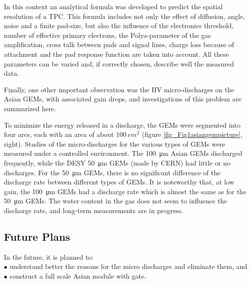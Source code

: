 In this context an analytical formula was developed to predict the spatial resolution of a TPC. This formula includes
not only the effect of diffusion, angle,
noise and a finite pad-size, but also the influence of the electronics threshold, number of effective primary electrons,
the Polya-parameter of the gas
amplification, cross talk between pads and signal lines, charge loss because of attachment and the pad response function
are taken into account. All
these parameters can be varied and, if correctly chosen, describe well the measured data.

Finally, one other important observation was the HV micro-discharges on the Asian GEMs, with associated gain drops,
and investigations of this problem are summarized here.

To minimize the energy released in a discharge, the GEMs were segmented into four arcs, each with an area of
about $\SI{100}{cm^2}$ (figure \ref{fig_Fig1asiangempicture}, right).
Studies of the micro-discharges for the various types of GEMs were measured under a controlled environment.
The \SI{100}{\micro\meter} Asian GEMs discharged frequently, while the DESY \SI{50}{\micro\meter} GEMs (made by CERN) had little or no
discharges. For the \SI{50}{\micro\meter} GEMs, there is no significant difference of
the discharge rate between different types of GEMs. It is noteworthy that, at low gain, the \SI{100}{\micro\meter} GEMs
had a discharge rate which is almost the same as for the \SI{50}{\micro\meter} GEMs. The water content in the gas does not seem to
influence the
discharge rate, and long-term measurements are in progress.


\subsection{Future Plans}

In the future, it is planned to:\\
$\bullet$ understand better the reasons for the micro discharges and eliminate them, and \\
$\bullet$ construct a full scale Asian module with gate.
